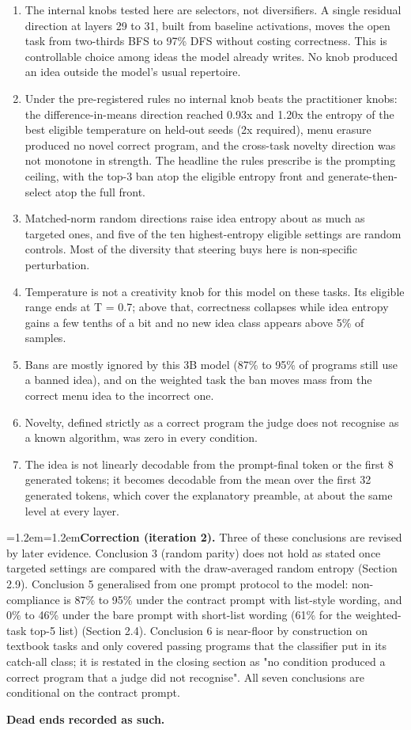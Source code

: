 \documentclass[11pt,letterpaper]{article}
\newenvironment{correction}{\par\medskip\noindent\begin{minipage}{\linewidth}\small\leftskip=1.2em\rightskip=1.2em\noindent}{\end{minipage}\par\medskip}
\begin{document}
\begin{enumerate}
\item The internal knobs tested here are selectors, not diversifiers. A single residual direction at layers 29 to 31, built from baseline activations, moves the open task from two-thirds BFS to 97\% DFS without costing correctness. This is controllable choice among ideas the model already writes. No knob produced an idea outside the model's usual repertoire.
\item Under the pre-registered rules no internal knob beats the practitioner knobs: the difference-in-means direction reached 0.93x and 1.20x the entropy of the best eligible temperature on held-out seeds (2x required), menu erasure produced no novel correct program, and the cross-task novelty direction was not monotone in strength. The headline the rules prescribe is the prompting ceiling, with the top-3 ban atop the eligible entropy front and generate-then-select atop the full front.
\item Matched-norm random directions raise idea entropy about as much as targeted ones, and five of the ten highest-entropy eligible settings are random controls. Most of the diversity that steering buys here is non-specific perturbation.
\item Temperature is not a creativity knob for this model on these tasks. Its eligible range ends at T = 0.7; above that, correctness collapses while idea entropy gains a few tenths of a bit and no new idea class appears above 5\% of samples.
\item Bans are mostly ignored by this 3B model (87\% to 95\% of programs still use a banned idea), and on the weighted task the ban moves mass from the correct menu idea to the incorrect one.
\item Novelty, defined strictly as a correct program the judge does not recognise as a known algorithm, was zero in every condition.
\item The idea is not linearly decodable from the prompt-final token or the first 8 generated tokens; it becomes decodable from the mean over the first 32 generated tokens, which cover the explanatory preamble, at about the same level at every layer.
\end{enumerate}
\begin{correction}\textbf{Correction (iteration 2).} Three of these conclusions are revised by later evidence. Conclusion 3 (random parity) does not hold as stated once targeted settings are compared with the draw-averaged random entropy (Section 2.9). Conclusion 5 generalised from one prompt protocol to the model: non-compliance is 87\% to 95\% under the contract prompt with list-style wording, and 0\% to 46\% under the bare prompt with short-list wording (61\% for the weighted-task top-5 list) (Section 2.4). Conclusion 6 is near-floor by construction on textbook tasks and only covered passing programs that the classifier put in its catch-all class; it is restated in the closing section as "no condition produced a correct program that a judge did not recognise". All seven conclusions are conditional on the contract prompt.\end{correction}
\textbf{Dead ends recorded as such.}
\end{document}

